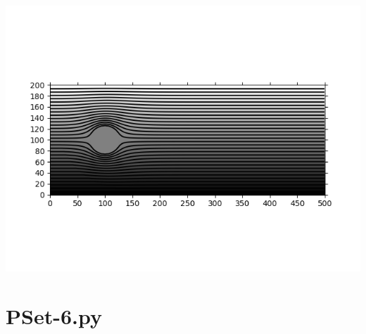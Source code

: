 \documentclass[12pt]{article}
\begin{document}
\includegraphics[width=\textwidth]{Problem-Set-6-Figure.png}
\clearpage

\section{PSet-6.py}

\end{document}
